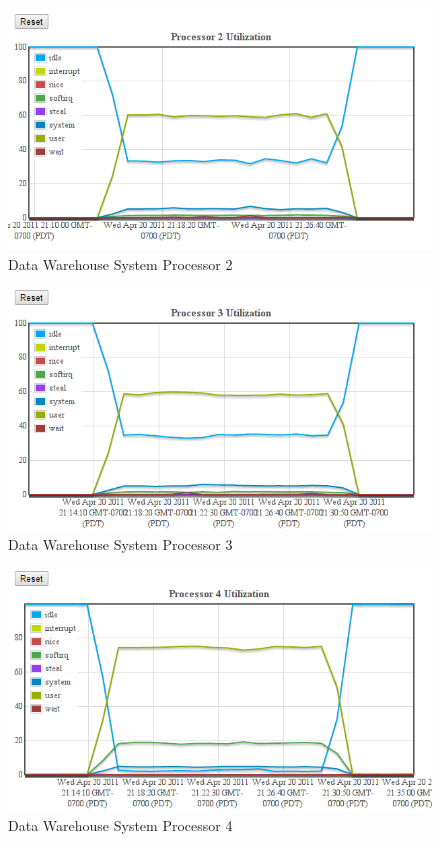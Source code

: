 \documentclass[twocolumn,letterpaper]{article}
\begin{document}
\begin{figure}[ht]
  \begin{center}
    \includegraphics[scale=0.37]{etl-c6-cpu-02}
  \end{center}
  \caption{Data Warehouse System Processor 2}
\end{figure}

\begin{figure}[ht]
  \begin{center}
    \includegraphics[scale=0.37]{etl-c6-cpu-03}
  \end{center}
  \caption{Data Warehouse System Processor 3}
\end{figure}

\begin{figure}[ht]
  \begin{center}
    \includegraphics[scale=0.37]{etl-c6-cpu-04}
  \end{center}
  \caption{Data Warehouse System Processor 4}
\end{figure}
\end{document}
